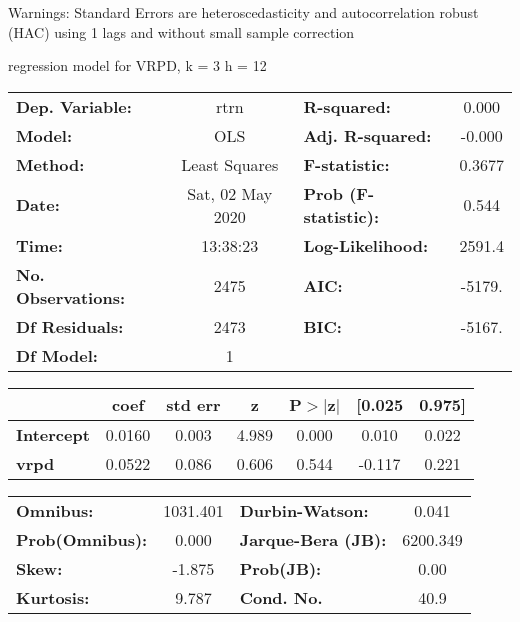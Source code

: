 Warnings: \newline
 [1] Standard Errors are heteroscedasticity and autocorrelation robust (HAC) using 1 lags and without small sample correction\ 

regression model for VRPD, k = 3 h = 12\begin{center}
\begin{tabular}{lclc}
\toprule
\textbf{Dep. Variable:}    &       rtrn       & \textbf{  R-squared:         } &     0.000   \\
\textbf{Model:}            &       OLS        & \textbf{  Adj. R-squared:    } &    -0.000   \\
\textbf{Method:}           &  Least Squares   & \textbf{  F-statistic:       } &    0.3677   \\
\textbf{Date:}             & Sat, 02 May 2020 & \textbf{  Prob (F-statistic):} &    0.544    \\
\textbf{Time:}             &     13:38:23     & \textbf{  Log-Likelihood:    } &    2591.4   \\
\textbf{No. Observations:} &        2475      & \textbf{  AIC:               } &    -5179.   \\
\textbf{Df Residuals:}     &        2473      & \textbf{  BIC:               } &    -5167.   \\
\textbf{Df Model:}         &           1      & \textbf{                     } &             \\
\bottomrule
\end{tabular}
\begin{tabular}{lcccccc}
                   & \textbf{coef} & \textbf{std err} & \textbf{z} & \textbf{P$> |$z$|$} & \textbf{[0.025} & \textbf{0.975]}  \\
\midrule
\textbf{Intercept} &       0.0160  &        0.003     &     4.989  &         0.000        &        0.010    &        0.022     \\
\textbf{vrpd}      &       0.0522  &        0.086     &     0.606  &         0.544        &       -0.117    &        0.221     \\
\bottomrule
\end{tabular}
\begin{tabular}{lclc}
\textbf{Omnibus:}       & 1031.401 & \textbf{  Durbin-Watson:     } &    0.041  \\
\textbf{Prob(Omnibus):} &   0.000  & \textbf{  Jarque-Bera (JB):  } & 6200.349  \\
\textbf{Skew:}          &  -1.875  & \textbf{  Prob(JB):          } &     0.00  \\
\textbf{Kurtosis:}      &   9.787  & \textbf{  Cond. No.          } &     40.9  \\
\bottomrule
\end{tabular}
\end{center}

